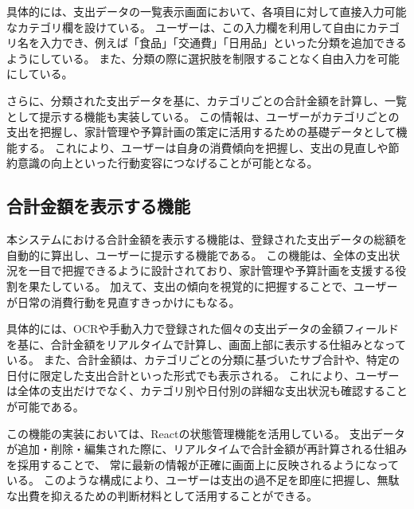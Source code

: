 \documentclass[main]{subfiles}
\begin{document}
具体的には、支出データの一覧表示画面において、各項目に対して直接入力可能なカテゴリ欄を設けている。
ユーザーは、この入力欄を利用して自由にカテゴリ名を入力でき、例えば「食品」「交通費」「日用品」といった分類を追加できるようにしている。
また、分類の際に選択肢を制限することなく自由入力を可能にしている。

さらに、分類された支出データを基に、カテゴリごとの合計金額を計算し、一覧として提示する機能も実装している。
この情報は、ユーザーがカテゴリごとの支出を把握し、家計管理や予算計画の策定に活用するための基礎データとして機能する。
これにより、ユーザーは自身の消費傾向を把握し、支出の見直しや節約意識の向上といった行動変容につなげることが可能となる。
\subsection{合計金額を表示する機能}

本システムにおける合計金額を表示する機能は、登録された支出データの総額を自動的に算出し、ユーザーに提示する機能である。
この機能は、全体の支出状況を一目で把握できるように設計されており、家計管理や予算計画を支援する役割を果たしている。
加えて、支出の傾向を視覚的に把握することで、ユーザーが日常の消費行動を見直すきっかけにもなる。

具体的には、OCRや手動入力で登録された個々の支出データの金額フィールドを基に、合計金額をリアルタイムで計算し、画面上部に表示する仕組みとなっている。
また、合計金額は、カテゴリごとの分類に基づいたサブ合計や、特定の日付に限定した支出合計といった形式でも表示される。
これにより、ユーザーは全体の支出だけでなく、カテゴリ別や日付別の詳細な支出状況も確認することが可能である。

この機能の実装においては、Reactの状態管理機能を活用している。
支出データが追加・削除・編集された際に、リアルタイムで合計金額が再計算される仕組みを採用することで、
常に最新の情報が正確に画面上に反映されるようになっている。
このような構成により、ユーザーは支出の過不足を即座に把握し、無駄な出費を抑えるための判断材料として活用することができる。
\end{document}
